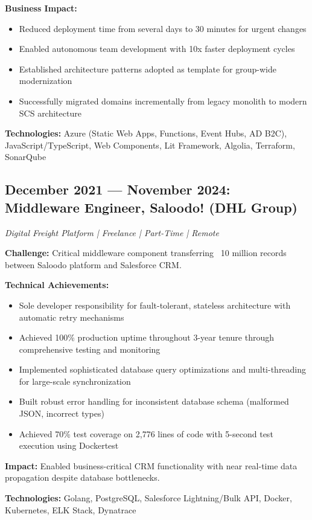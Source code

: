 \documentclass[11pt,a4paper]{article}
\begin{document}
\textbf{Business Impact:}
\begin{itemize}[leftmargin=12pt,topsep=0pt,itemsep=0pt]
\item Reduced deployment time from several days to 30 minutes for urgent changes
\item Enabled autonomous team development with 10x faster deployment cycles
\item Established architecture patterns adopted as template for group-wide modernization
\item Successfully migrated domains incrementally from legacy monolith to modern SCS architecture
\end{itemize}

\textbf{Technologies:} Azure (Static Web Apps, Functions, Event Hubs, AD B2C), JavaScript/TypeScript, Web Components, Lit Framework, Algolia, Terraform, SonarQube

\subsection{December 2021 — November 2024: Middleware Engineer, Saloodo! (DHL Group)}
\textit{Digital Freight Platform | Freelance | Part-Time | Remote}

\textbf{Challenge:} Critical middleware component transferring ~10 million records between Saloodo platform and Salesforce CRM.

\textbf{Technical Achievements:}
\begin{itemize}[leftmargin=12pt,topsep=0pt,itemsep=0pt]
\item Sole developer responsibility for fault-tolerant, stateless architecture with automatic retry mechanisms
\item Achieved 100\% production uptime throughout 3-year tenure through comprehensive testing and monitoring
\item Implemented sophisticated database query optimizations and multi-threading for large-scale synchronization
\item Built robust error handling for inconsistent database schema (malformed JSON, incorrect types)
\item Achieved 70\% test coverage on 2,776 lines of code with 5-second test execution using Dockertest
\end{itemize}

\textbf{Impact:} Enabled business-critical CRM functionality with near real-time data propagation despite database bottlenecks.

\textbf{Technologies:} Golang, PostgreSQL, Salesforce Lightning/Bulk API, Docker, Kubernetes, ELK Stack, Dynatrace
\end{document}
